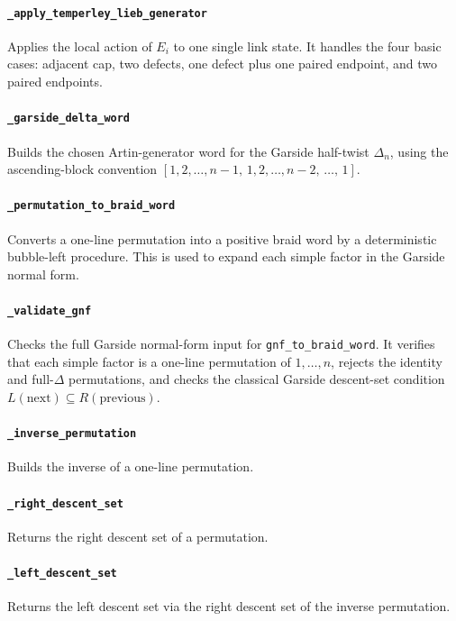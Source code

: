 ﻿\documentclass[10pt]{article}
\begin{document}
\paragraph{\texttt{\_apply\_temperley\_lieb\_generator}}
Applies the local action of \(E_i\) to one single link state.
It handles the four basic cases: adjacent cap, two defects, one defect plus one paired endpoint, and two paired endpoints.

\paragraph{\texttt{\_garside\_delta\_word}}
Builds the chosen Artin-generator word for the Garside half-twist \(\Delta_n\), using the ascending-block convention $[1,2,\dots,n-1,\,1,2,\dots,n-2,\,\dots,\,1]$.

\paragraph{\texttt{\_permutation\_to\_braid\_word}}
Converts a one-line permutation into a positive braid word by a deterministic bubble-left procedure.
This is used to expand each simple factor in the Garside normal form.

\paragraph{\texttt{\_validate\_gnf}}
Checks the full Garside normal-form input for \texttt{gnf\_to\_braid\_word}.
It verifies that each simple factor is a one-line permutation of \(1,\dots,n\),
rejects the identity and full-\(\Delta\) permutations, and checks the classical
Garside descent-set condition $L(\text{next}) \subseteq R(\text{previous})$.

\paragraph{\texttt{\_inverse\_permutation}}
Builds the inverse of a one-line permutation.

\paragraph{\texttt{\_right\_descent\_set}}
Returns the right descent set of a permutation.

\paragraph{\texttt{\_left\_descent\_set}}
Returns the left descent set via the right descent set of the inverse permutation.
\end{document}
